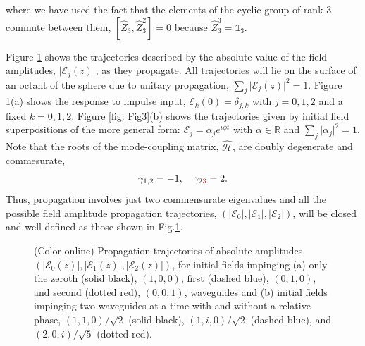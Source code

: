 \documentclass[9pt,twocolumn,twoside]{osajnl}
\begin{document}
where we have used the fact that the elements of the cyclic group of rank $3$ commute between them, $\left[ \hat{Z}_{3} , \hat{Z}_{3}^{2} \right] = 0$ because $\hat{Z}_{3}^{3} = \mathbb{1}_{3}$.  

Figure \ref{fig: Fig4} shows the trajectories described by the absolute value of the field amplitudes, $\vert \mathcal{E}_{j}(z)\vert$, as they propagate. 
All trajectories will lie on the surface of an octant of the sphere due to unitary propagation, $\sum_{j} \vert \mathcal{E}_{j}(z) \vert^2 =1$.
Figure \ref{fig: Fig4}(a) shows the response to impulse input, $ \mathcal{E}_{k}(0)  = \delta_{j,k}$ with $j=0,1,2$ and a fixed $k=0,1,2$. 
Figure \ref{fig: Fig3}(b) shows the trajectories given by initial field superpositions of the more general form: $\mathcal{E}_{j} = \alpha_{j} e^{i \phi t}$ with $\alpha \in \mathbb{R}$ and $\sum_{j} \vert \alpha_{j} \vert^{2} =1$.
Note that the roots of the mode-coupling matrix, $\hat{\mathcal{H}}$, are doubly degenerate and commesurate, 
\begin{eqnarray}
\gamma_{1,2} = -1, \quad \gamma_{2\textcolor{red}{3}} = 2.
\end{eqnarray}
Thus, propagation involves just two commensurate eigenvalues and all the possible field amplitude propagation trajectories, $\left( \vert \mathcal{E}_{0} \vert, \vert \mathcal{E}_{1} \vert, \vert \mathcal{E}_{2} \vert  \right)$, will be closed and well defined as those shown in Fig.\ref{fig: Fig4}.


\begin{figure}[htbp]
\centering
{}
\caption{(Color online) Propagation trajectories of absolute amplitudes, $(\vert \mathcal{E}_{0}(z) \vert, \vert \mathcal{E}_{1}(z) \vert, \vert \mathcal{E}_{2}(z) \vert )$, for initial fields impinging (a) only the zeroth (solid black), $(1,0,0)$, first (dashed blue), $(0,1,0)$, and second (dotted red), $(0,0,1)$, waveguides and (b) initial fields impinging two waveguides at a time with and without a relative phase, $(1,1,0)/ \sqrt{2}$ (solid black), $(1,i,0)/\sqrt{2}$ (dashed blue), and $(2,0,i)/\sqrt{5}$ (dotted red).}
\label{fig: Fig4}
\end{figure}
\end{document}

